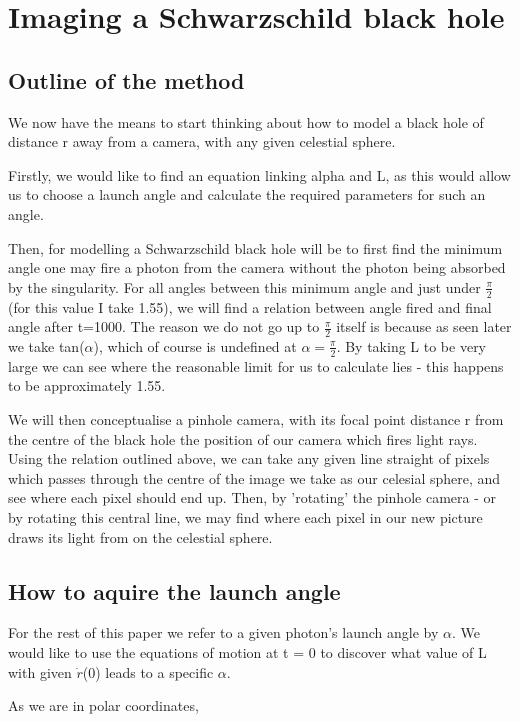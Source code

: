 \documentclass[oneside,openright,frontopenright]{dmathesis}
\begin{document}
\chapter{Imaging a Schwarzschild black hole}
\section{Outline of the method}

	We now have the means to start thinking about how to model a black hole of distance r away from a camera, with any given celestial sphere.

	Firstly, we would like to find an equation linking alpha and L, as this would allow us to choose a launch angle and calculate the required parameters for such an angle.

	Then, for modelling a Schwarzschild black hole will be to first find the minimum angle one may fire a photon from the camera without the photon being absorbed by the singularity. For all angles between this minimum angle and just under $\frac{\pi}{2}$ (for this value I take 1.55), we will find a relation between angle fired and final angle after t=1000. The reason we do not go up to $\frac{\pi}{2}$ itself is because as seen later we take tan($\alpha$), which of course is undefined at $\alpha = \frac{\pi}{2}$. By taking L to be very large we can see where the reasonable limit for us to calculate lies - this happens to be approximately 1.55.

	We will then conceptualise a pinhole camera, with its focal point distance r from the centre of the black hole the position of our camera which fires light rays. Using the relation outlined above, we can take any given line straight of pixels which passes through the centre of the image we take as our celesial sphere, and see where each pixel should end up. Then, by 'rotating' the pinhole camera - or by rotating this central line, we may find where each pixel in our new picture draws its light from on the celestial sphere.

\section{How to aquire the launch angle}

	For the rest of this paper we refer to a given photon's launch angle by $\alpha$. We would like to use the equations of motion at t = 0 to discover what value of L with given $\dot{r}$(0) leads to a specific $\alpha$.

	As we are in polar coordinates, 
\end{document}
